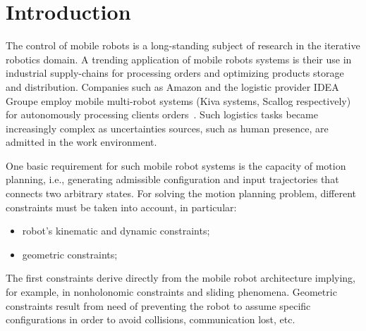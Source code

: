 \documentclass[eprint]{actapoly}
\begin{document}
\section{Introduction}\label{sec:intro}






The %
control of mobile robots is a long-standing subject of research 
in the iterative robotics domain. A trending application of mobile robots systems
is their use in industrial supply-chains for processing orders and optimizing products storage and distribution. Companies such as Amazon and the logistic provider IDEA Groupe employ mobile multi-robot systems (Kiva systems, Scallog respectively) for autonomously processing clients orders~\cite{Gizmag,supplychain}.
Such logistics tasks became increasingly complex as uncertainties sources, such as human presence, are admitted in the work environment.


One basic requirement for such mobile robot systems is the capacity of motion planning, i.e., generating admissible configuration and input trajectories that connects two arbitrary states. For solving the motion planning problem, different 
constraints must be taken into account, in particular:

\begin{itemize}

 \item robot's kinematic and dynamic constraints;

 \item geometric constraints;


\end{itemize}

The first constraints derive directly from the mobile robot architecture 
implying, for example, in nonholonomic constraints and sliding phenomena.
Geometric 
constraints result from need of preventing the robot to assume specific configurations
in order to avoid collisions, communication lost, etc.
\end{document}
